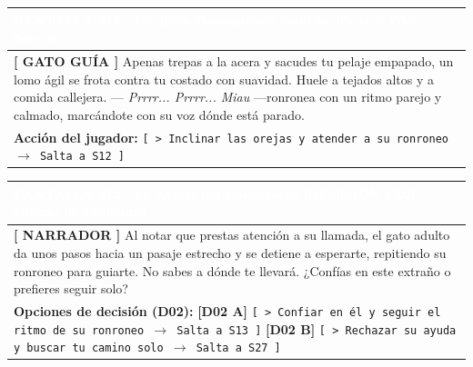 \documentclass[11pt, a4paper]{article}
\begin{document}
\noindent
\begin{tabularx}{\textwidth}{|X|}
\hline
\rowcolor{colorHeader}
\textbf{\textcolor{white}{PANTALLA S11 $\cdot$ Un Roce Desconocido}} \hfill \small\textcolor{white}{Sentido: Tacto y Olor Nuevo} \\ \hline
\rowcolor{colorTextoBox}
\textbf{\textcolor{colorEmisor}{[ GATO GUÍA ]}} \vspace{0.2em}\newline
Apenas trepas a la acera y sacudes tu pelaje empapado, un lomo ágil se frota contra tu costado con suavidad. Huele a tejados altos y a comida callejera. \newline
--- \textit{Prrrr... Prrrr... Miau} ---ronronea con un ritmo parejo y calmado, marcándote con su voz dónde está parado. \\ \hline
\rowcolor{colorBotonBox}
\textbf{Acción del jugador:} \newline
\texttt{[ > Inclinar las orejas y atender a su ronroneo $\rightarrow$ Salta a S12 ]} \\ \hline
\end{tabularx}

\vspace{1em}

\noindent
\begin{tabularx}{\textwidth}{|X|}
\hline
\rowcolor{colorDecision}
\textbf{\textcolor{white}{PANTALLA S12 $\cdot$ La Ayuda del Compañero [DECISIÓN D02]}} \hfill \small\textcolor{white}{Dilema de Confianza} \\ \hline
\rowcolor{colorTextoBox}
\textbf{\textcolor{colorEmisor}{[ NARRADOR ]}} \vspace{0.2em}\newline
Al notar que prestas atención a su llamada, el gato adulto da unos pasos hacia un pasaje estrecho y se detiene a esperarte, repitiendo su ronroneo para guiarte. No sabes a dónde te llevará. ¿Confías en este extraño o prefieres seguir solo? \\ \hline
\rowcolor{colorBotonBox}
\textbf{Opciones de decisión (D02):} \newline
\textbf{[D02 A]} \texttt{[ > Confiar en él y seguir el ritmo de su ronroneo $\rightarrow$ Salta a S13 ]} \vspace{0.3em}\newline
\textbf{[D02 B]} \texttt{[ > Rechazar su ayuda y buscar tu camino solo $\rightarrow$ Salta a S27 ]} \\ \hline
\end{tabularx}
\end{document}
